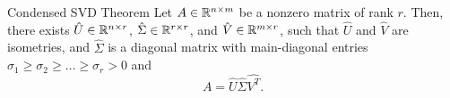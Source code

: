 \documentclass[letterpaper]{article}
\newcommand{\0}{\mathbf{0}}
\begin{document}
\begin{theorem}{Condensed SVD Theorem}{}
    Let $A \in \mathbb{R}^{n \times m}$ be a nonzero matrix of rank $r$. Then, there exists $\hat{U} \in \mathbb{R}^{n \times r}$, $\hat{\Sigma} \in \mathbb{R}^{r \times r}$, and $\hat{V} \in \mathbb{R}^{m \times r}$, such that $\hat{U}$ and $\hat{V}$ are isometries, and $\hat{\Sigma}$ is a diagonal matrix with main-diagonal entries $\sigma_1 \geq \sigma_2 \geq \hdots \geq \sigma_r > 0$ and \[A = \hat{U}\hat{\Sigma}\hat{V^T}.\]
\end{theorem}
\end{document}
